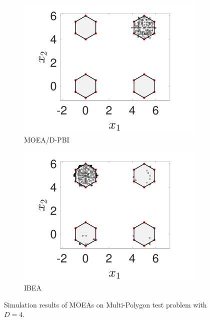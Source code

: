 \documentclass[conference]{IEEEtran}
\begin{document}
\begin{figure}[htbp]
    \begin{subfigure}[b]{.24\textwidth}
    \includegraphics[width=\linewidth]{Section5/dim4/PS/MOEAD_PBI}
    \caption{MOEA/D-PBI}
    \end{subfigure}
    \begin{subfigure}[b]{.24\textwidth}
    \includegraphics[width=\linewidth]{Section5/dim4/PS/IBEA}
    \caption{IBEA}
    \end{subfigure}

    \caption{Simulation results of MOEAs on Multi-Polygon test problem with $D=4$.}
    \label{fig: MOEAs PS dim=4}
\end{figure}
\end{document}
